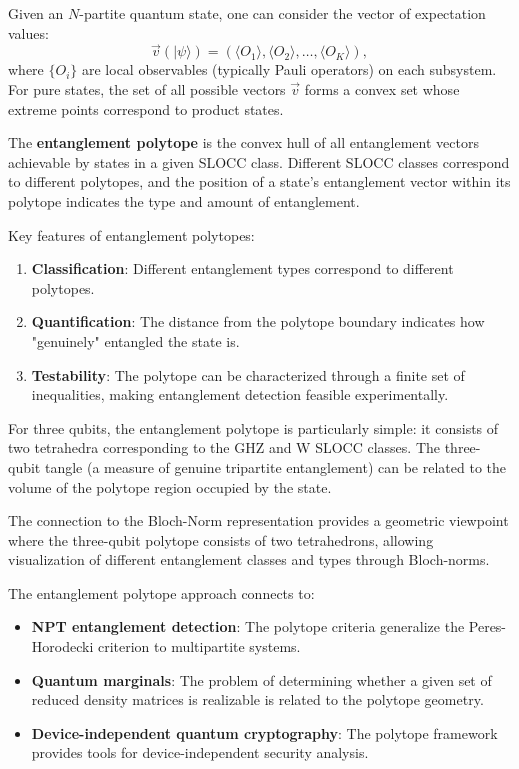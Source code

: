 \documentclass[%
 amsmath,amssymb,
 aps,
rmp,
]{revtex4-2}
\begin{document}
Given an $N$-partite quantum state, one can consider the vector of expectation values:
\begin{equation}
	\vec{v}(|\psi\rangle) = (\langle O_1 \rangle, \langle O_2 \rangle, \ldots, \langle O_K \rangle),
\end{equation}
where $\{O_i\}$ are local observables (typically Pauli operators) on each subsystem. For pure states, the set of all possible vectors $\vec{v}$ forms a convex set whose extreme points correspond to product states.

The \textbf{entanglement polytope} is the convex hull of all entanglement vectors achievable by states in a given SLOCC class. Different SLOCC classes correspond to different polytopes, and the position of a state's entanglement vector within its polytope indicates the type and amount of entanglement.

Key features of entanglement polytopes:
\begin{enumerate}
	\item \textbf{Classification}: Different entanglement types correspond to different polytopes.
	\item \textbf{Quantification}: The distance from the polytope boundary indicates how "genuinely" entangled the state is.
	\item \textbf{Testability}: The polytope can be characterized through a finite set of inequalities, making entanglement detection feasible experimentally.
\end{enumerate}

For three qubits, the entanglement polytope is particularly simple: it consists of two tetrahedra corresponding to the GHZ and W SLOCC classes. The three-qubit tangle (a measure of genuine tripartite entanglement) can be related to the volume of the polytope region occupied by the state.

The connection to the Bloch-Norm representation provides a geometric viewpoint where the three-qubit polytope consists of two tetrahedrons, allowing visualization of different entanglement classes and types through Bloch-norms.

The entanglement polytope approach connects to:
\begin{itemize}
	\item \textbf{NPT entanglement detection}: The polytope criteria generalize the Peres-Horodecki criterion to multipartite systems.
	\item \textbf{Quantum marginals}: The problem of determining whether a given set of reduced density matrices is realizable is related to the polytope geometry.
	\item \textbf{Device-independent quantum cryptography}: The polytope framework provides tools for device-independent security analysis.
\end{itemize}
\end{document}
